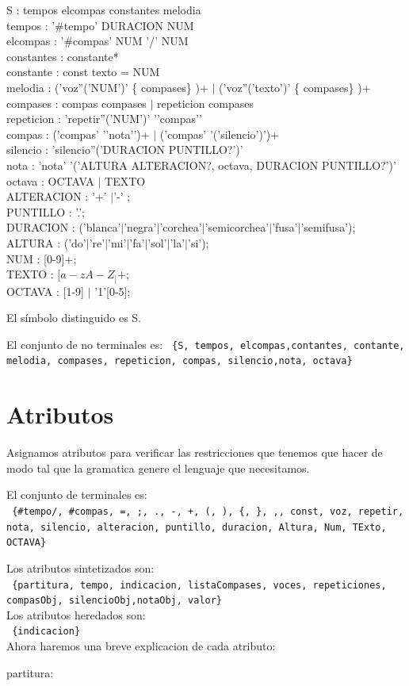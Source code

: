 \documentclass[a4paper]{article}
\begin{document}
S : tempos elcompas constantes melodia \\
tempos : '\#tempo' DURACION NUM \\
elcompas :  '\#compas' NUM '/' NUM \\
constantes :  constante* \\
constante :  const texto = NUM \\
melodia :  ('voz''('NUM')' \{ compases\} )+ $|$ ('voz''('texto')' \{ compases\} )+ \\
compases : compas compases $|$ repeticion compases \\
repeticion : 'repetir''('NUM')' '{'compas'}' \\
compas : ('compas' '{'nota'}')+ $|$ ('compas' '('silencio')')+ \\
silencio : 'silencio''('DURACION PUNTILLO?')' \\
nota : 'nota' '('ALTURA ALTERACION?, octava, DURACION PUNTILLO?')' \\
octava : OCTAVA $|$ TEXTO \\
ALTERACION : '+' $|$'-' ; \\
PUNTILLO : '.'; \\
DURACION : ('blanca'$|$'negra'$|$'corchea'$|$'semicorchea'$|$'fusa'$|$'semifusa'); \\
ALTURA : ('do'$|$'re'$|$'mi'$|$'fa'$|$'sol'$|$'la'$|$'si'); \\
NUM : [0-9]+; \\
TEXTO : $[a-zA-Z_]$+; \\
OCTAVA : [1-9] $|$ '1'[0-5]; \linebreak



El símbolo distinguido es S.\linebreak


El conjunto de no terminales es:\linebreak
\texttt{
\{S, tempos, elcompas,contantes, contante, melodia, compases, repeticion, compas, silencio,nota, octava\}  \\
} 

\section{Atributos}

Asignamos atributos para verificar las restricciones que tenemos que hacer de modo tal que la gramatica genere el lenguaje que necesitamos.

El conjunto de terminales es: \\
\texttt{
\{\#tempo/, \#compas, =, ;, ., -, +, (, ), \{, \}, ,,  const, voz, repetir, nota, silencio,  alteracion, puntillo, duracion, Altura, Num, TExto, OCTAVA\}
}\linebreak

Los atributos sintetizados son:\\
\texttt{
\{partitura, tempo, indicacion, listaCompases, voces, repeticiones, compasObj, silencioObj,notaObj, valor\}
}\\  


Los atributos heredados son: \\
\texttt{
\{indicacion\}
}\\  

Ahora haremos una breve explicacion de cada atributo:

partitura:
\end{document}
